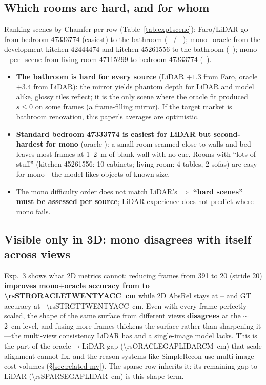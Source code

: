 \subsection{Which rooms are hard, and for whom}\label{sec:rooms}
Ranking scenes by Chamfer per row (Table~\ref{tab:exp1scene}): Faro/LiDAR go from bedroom 47333774 (easiest) to the
bathroom (\rsGTb--\rsGTd{} / \rsLIDARb--\rsLIDARd); mono$+$oracle from the development kitchen 42444474 and kitchen
45261556 to the bathroom (\rsORACLEa--\rsORACLEd); mono$+$per\_scene from living room 47115299 to bedroom 47333774
(\rsSCENEc--\rsSCENEb).
\begin{itemize}
\item \textbf{The bathroom is hard for every source} (LiDAR $+1.3$ from Faro, oracle $+3.4$ from LiDAR): the mirror yields
phantom depth for LiDAR and model alike, glossy tiles reflect; it is the only scene where the oracle fit produced
$s \leq 0$ on some frames (a frame-filling mirror). If the target market is bathroom renovation, this paper's averages
are optimistic.
\item \textbf{Standard bedroom 47333774 is easiest for LiDAR but second-hardest for mono} (oracle \rsORACLEb): a small room
scanned close to walls and bed leaves most frames at 1--\SI{2}{m} of blank wall with no cue. Rooms with ``lots of
stuff'' (kitchen 45261556: 10 cabinets; living room: 4 tables, 2 sofas) are easy for mono---the model likes objects of
known size.
\item The mono difficulty order does not match LiDAR's $\Rightarrow$ \textbf{``hard scenes'' must be assessed per
source}; LiDAR experience does not predict where mono fails.
\end{itemize}

\subsection{Visible only in 3D: mono disagrees with itself across views}
Exp.~3 shows what 2D metrics cannot: reducing frames from 391 to 20 (stride 20) \textbf{improves mono$+$oracle accuracy
from \rsSTRORACLEONEACC{} to \SI{\rsSTRORACLETWENTYACC}{cm}} while 2D AbsRel stays at
\rsSTRORACLEONEABSREL--\rsSTRORACLETWENTYABSREL{} and GT accuracy at \rsSTRGTONEACC--\SI{\rsSTRGTTWENTYACC}{cm}. Even with every frame perfectly scaled,
the shape of the same surface from different views \textbf{disagrees} at the $\sim$\SI{2}{cm} level, and fusing more
frames thickens the surface rather than sharpening it---the multi-view consistency LiDAR has and a single-image model
lacks. This is the part of the oracle$\rightarrow$LiDAR gap (\SI{\rsORACLEGAPLIDARCM}{cm}) that scale alignment cannot fix, and the
reason systems like SimpleRecon use multi-image cost volumes (\S\ref{sec:related-mv}). The sparse row inherits it: its remaining gap to
LiDAR (\SI{\rsSPARSEGAPLIDAR}{cm}) is this shape term.


